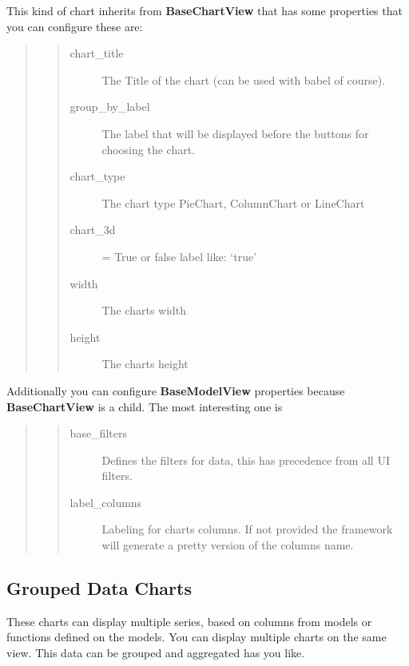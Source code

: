 \documentclass[letterpaper,10pt,english]{sphinxmanual}
\begin{document}
This kind of chart inherits from \textbf{BaseChartView} that has some properties that you can configure
these are:
\begin{quote}
\begin{quote}\begin{description}
\item[{chart\_title}] \leavevmode
The Title of the chart (can be used with babel of course).

\item[{group\_by\_label}] \leavevmode
The label that will be displayed before the buttons for choosing the chart.

\item[{chart\_type}] \leavevmode
The chart type PieChart, ColumnChart or LineChart

\item[{chart\_3d}] \leavevmode
= True or false label like: `true'

\item[{width}] \leavevmode
The charts width

\item[{height}] \leavevmode
The charts height

\end{description}\end{quote}
\end{quote}

Additionally you can configure \textbf{BaseModelView} properties because \textbf{BaseChartView} is a child.
The most interesting one is
\begin{quote}
\begin{quote}\begin{description}
\item[{base\_filters}] \leavevmode
Defines the filters for data, this has precedence from all UI filters.

\item[{label\_columns}] \leavevmode
Labeling for charts columns. If not provided the framework will
generate a pretty version of the columns name.

\end{description}\end{quote}
\end{quote}


\subsection{Grouped Data Charts}
\label{quickcharts:grouped-data-charts}
These charts can display multiple series, based on columns from models or functions defined on the models.
You can display multiple charts on the same view. This data can be grouped and aggregated has you like.
\end{document}
